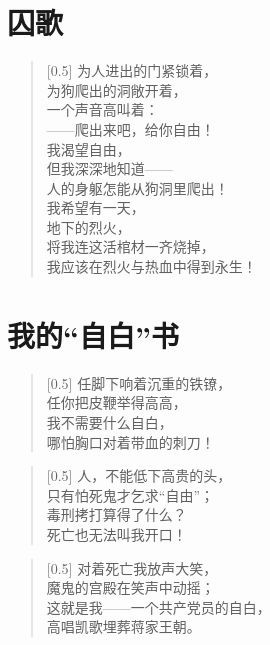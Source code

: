 \documentclass[12pt,UTF-8,openany]{ctexbook}
\begin{document}
\chapter{囚歌}

\begin{Large}
    
    \begin{verse}[0.5\linewidth]
        为人进出的门紧锁着， \\
        为狗爬出的洞敞开着， \\
        一个声音高叫着： \\
        ——爬出来吧，给你自由！ \\
        我渴望自由， \\
        但我深深地知道—— \\
        人的身躯怎能从狗洞里爬出！ \\
        我希望有一天， \\
        地下的烈火， \\
        将我连这活棺材一齐烧掉， \\
        我应该在烈火与热血中得到永生！
    \end{verse}
    
\end{Large}

\chapter{我的“自白”书}

\begin{Large}
    
    \begin{verse}[0.5\linewidth]
        任脚下响着沉重的铁镣， \\
        任你把皮鞭举得高高， \\
        我不需要什么自白， \\
        哪怕胸口对着带血的刺刀！
    \end{verse}
    
    
    \begin{verse}[0.5\linewidth]
        人，不能低下高贵的头， \\
        只有怕死鬼才乞求“自由”； \\
        毒刑拷打算得了什么？ \\
        死亡也无法叫我开口！
    \end{verse}
    
    
    \begin{verse}[0.5\linewidth]
        对着死亡我放声大笑， \\
        魔鬼的宫殿在笑声中动摇； \\
        这就是我——一个共产党员的自白， \\
        高唱凯歌埋葬蒋家王朝。
    \end{verse}
    
\end{Large}
\end{document}
